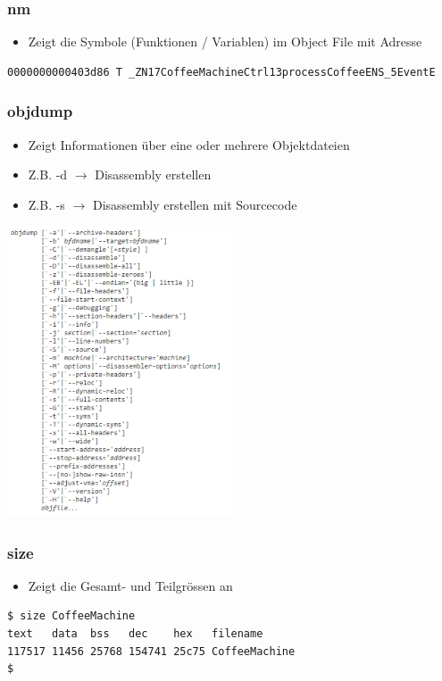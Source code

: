 \subsubsection{nm}
\begin{itemize}
    \item Zeigt die Symbole (Funktionen / Variablen) im Object File mit Adresse
\end{itemize}
\begin{lstlisting}[style=cpp]
0000000000403d86 T _ZN17CoffeeMachineCtrl13processCoffeeENS_5EventE
\end{lstlisting}

\subsubsection{objdump}
\begin{itemize}
    \item Zeigt Informationen über eine oder mehrere Objektdateien
    \item Z.B. -d $\rightarrow$ Disassembly erstellen
    \item Z.B. -s $\rightarrow$ Disassembly erstellen mit Sourcecode
\end{itemize}
\includegraphics[width=0.5\textwidth]{images/LinuxDevTools/objdump.png}

\subsubsection{size}
\begin{itemize}
    \item Zeigt die Gesamt- und Teilgrössen an
\end{itemize}
\begin{lstlisting}[style=cpp]
$ size CoffeeMachine
text   data  bss   dec    hex   filename
117517 11456 25768 154741 25c75 CoffeeMachine
$
\end{lstlisting}

